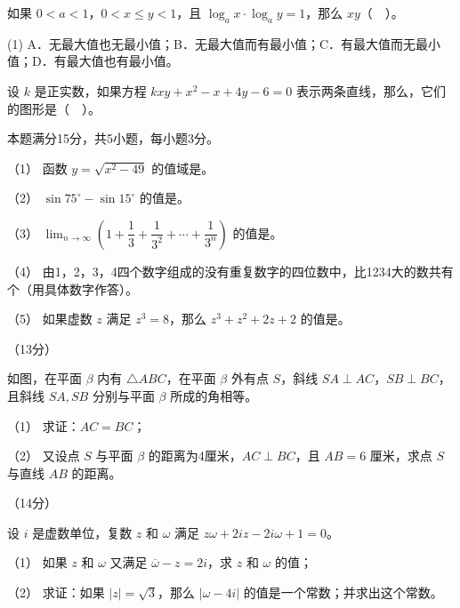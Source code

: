 \begin{question}
如果 $0<a<1$，$0<x\le y<1$，且 $\log_ax\cdot\log_ay=1$，那么 $xy$（　）。

\begin{gkopts}(1)
\task A．无最大值也无最小值；B．无最大值而有最小值；C．有最大值而无最小值；D．有最大值也有最小值。
\end{gkopts}

\Needspace{0.4\textheight}
\end{question}
\begin{question}
设 $k$ 是正实数，如果方程 $kxy+x^2-x+4y-6=0$ 表示两条直线，那么，它们的图形是（　）。
\nopagebreak[4]
\begin{center}\end{center}
\nopagebreak[4]
\end{question}
\begin{question}
本题满分15分，共5小题，每小题3分。

（1） 函数 $y=\sqrt{x^2-49}$ 的值域是\gkblank{}。

（2） $\sin75^\circ-\sin15^\circ$ 的值是\gkblank{}。

（3） $\displaystyle\lim_{n\to\infty}\left(1+\dfrac13+\dfrac1{3^2}+\cdots+\dfrac1{3^n}\right)$ 的值是\gkblank{}。

（4） 由1，2，3，4四个数字组成的没有重复数字的四位数中，比1234大的数共有\gkblank{}个（用具体数字作答）。

（5） 如果虚数 $z$ 满足 $z^3=8$，那么 $z^3+z^2+2z+2$ 的值是\gkblank{}。

\Needspace{0.4\textheight}
\end{question}
\begin{question}
（13分）

如图，在平面 $\beta$ 内有 $\triangle ABC$，在平面 $\beta$ 外有点 $S$，斜线 $SA\perp AC$，$SB\perp BC$，且斜线 $SA,SB$ 分别与平面 $\beta$ 所成的角相等。

（1） 求证：$AC=BC$；

（2） 又设点 $S$ 与平面 $\beta$ 的距离为4厘米，$AC\perp BC$，且 $AB=6$ 厘米，求点 $S$ 与直线 $AB$ 的距离。
\nopagebreak[4]
\begin{center}\end{center}
\nopagebreak[4]
\end{question}
\begin{question}
（14分）

设 $i$ 是虚数单位，复数 $z$ 和 $\omega$ 满足 $z\omega+2iz-2i\omega+1=0$。

（1） 如果 $z$ 和 $\omega$ 又满足 $\overline\omega-z=2i$，求 $z$ 和 $\omega$ 的值；

（2） 求证：如果 $|z|=\sqrt3$，那么 $|\omega-4i|$ 的值是一个常数；并求出这个常数。

\end{question}
